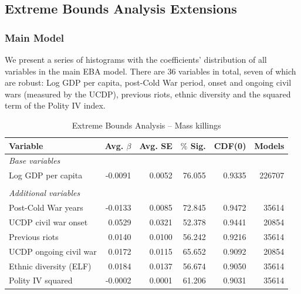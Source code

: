 \documentclass[a4paper,12pt]{article}
\begin{document}
\newpage

\subsection{Extreme Bounds Analysis Extensions}
\label{sec:mk-ebae}

\subsubsection{Main Model}

We present a series of histograms with the coefficients' distribution of all variables in the main EBA model. There are 36 variables in total, seven of which are robust: Log GDP per capita, post-Cold War period, onset and ongoing civil wars (measured by the UCDP), previous riots, ethnic diversity and the squared term of the Polity IV index.

\vspace{1cm}

\begin{table}[H]
\centering
\begin{tabular}{lrrrrr}
\hline
\textbf{Variable} & \textbf{Avg. $\beta$} & \textbf{Avg. SE} & \textbf{$\%$ Sig.} & \textbf{CDF(0)} & \textbf{Models} \\ \hline
\textit{Base variables} &  &  &  &  &  \\
Log GDP per capita & -0.0091 & 0.0052 & 76.055 & 0.9335 & 226707 \\
 &  &  &  &  &  \\
\textit{Additional variables} &  &  &  &  &  \\
Post-Cold War years & -0.0133 & 0.0085 & 72.845 & 0.9472 & 35614 \\
UCDP civil war onset & 0.0529 & 0.0321 & 52.378 & 0.9441 & 20854 \\
Previous riots & 0.0140 & 0.0100 & 56.242 & 0.9216 & 35614 \\
UCDP ongoing civil war & 0.0172 & 0.0115 & 65.652 & 0.9092 & 20854 \\
Ethnic diversity (ELF) & 0.0184 & 0.0137 & 56.674 & 0.9050 & 35614 \\
Polity IV squared & -0.0002 & 0.0001 & 61.206 & 0.9031 & 35614 \\ \hline
\end{tabular}
\caption{Extreme Bounds Analysis -- Mass killings}
\label{tab:mk}
\end{table}
\end{document}
